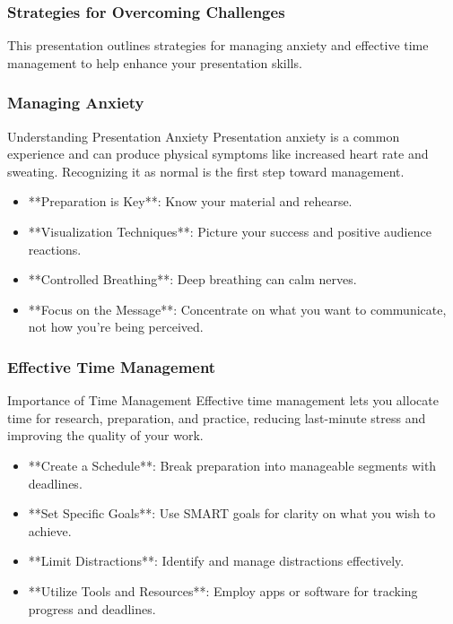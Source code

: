 \documentclass[aspectratio=169]{beamer}
\begin{document}
\begin{frame}[fragile]
    \frametitle{Strategies for Overcoming Challenges}
    This presentation outlines strategies for managing anxiety and effective time management to help enhance your presentation skills.
\end{frame}

\begin{frame}[fragile]
    \frametitle{Managing Anxiety}
    \begin{block}{Understanding Presentation Anxiety}
        Presentation anxiety is a common experience and can produce physical symptoms like increased heart rate and sweating. Recognizing it as normal is the first step toward management.
    \end{block}
    
    \begin{itemize}
        \item **Preparation is Key**: Know your material and rehearse.
        \item **Visualization Techniques**: Picture your success and positive audience reactions.
        \item **Controlled Breathing**: Deep breathing can calm nerves.
        \item **Focus on the Message**: Concentrate on what you want to communicate, not how you're being perceived.
    \end{itemize}
\end{frame}

\begin{frame}[fragile]
    \frametitle{Effective Time Management}
    \begin{block}{Importance of Time Management}
        Effective time management lets you allocate time for research, preparation, and practice, reducing last-minute stress and improving the quality of your work.
    \end{block}

    \begin{itemize}
        \item **Create a Schedule**: Break preparation into manageable segments with deadlines.
        \item **Set Specific Goals**: Use SMART goals for clarity on what you wish to achieve.
        \item **Limit Distractions**: Identify and manage distractions effectively.
        \item **Utilize Tools and Resources**: Employ apps or software for tracking progress and deadlines.
    \end{itemize}
\end{frame}
\end{document}
